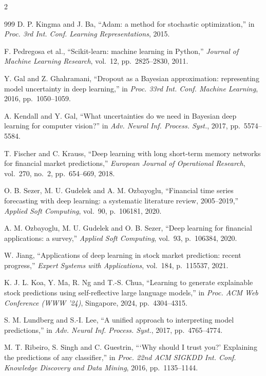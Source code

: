 \begin{footnotesize}
\begin{multicols}{2}
\begin{thebibliography}{999}
 D. P. Kingma and J. Ba, ``Adam: a method for stochastic optimization,'' in
\emph{Proc. 3rd Int. Conf. Learning Representations}, 2015.

 F. Pedregosa et al., ``Scikit-learn: machine learning in Python,''
\emph{Journal of Machine Learning Research}, vol.~12, pp.~2825--2830, 2011.

 Y. Gal and Z. Ghahramani, ``Dropout as a Bayesian approximation:
representing model uncertainty in deep learning,'' in \emph{Proc. 33rd Int. Conf. Machine
Learning}, 2016, pp.~1050--1059.

 A. Kendall and Y. Gal, ``What uncertainties do we need in Bayesian deep
learning for computer vision?'' in \emph{Adv. Neural Inf. Process. Syst.}, 2017, pp.~5574--5584.

 T. Fischer and C. Krauss, ``Deep learning with long short-term memory
networks for financial market predictions,'' \emph{European Journal of Operational Research},
vol.~270, no.~2, pp.~654--669, 2018.

 O. B. Sezer, M. U. Gudelek and A. M. Ozbayoglu, ``Financial time series
forecasting with deep learning: a systematic literature review, 2005--2019,'' \emph{Applied Soft
Computing}, vol.~90, p.~106181, 2020.

 A. M. Ozbayoglu, M. U. Gudelek and O. B. Sezer, ``Deep learning for
financial applications: a survey,'' \emph{Applied Soft Computing}, vol.~93, p.~106384, 2020.

 W. Jiang, ``Applications of deep learning in stock market prediction: recent
progress,'' \emph{Expert Systems with Applications}, vol.~184, p.~115537, 2021.

 K. J. L. Koa, Y. Ma, R. Ng and T.-S. Chua, ``Learning to generate explainable
stock predictions using self-reflective large language models,'' in \emph{Proc. ACM Web Conference
(WWW '24)}, Singapore, 2024, pp.~4304--4315.

 S. M. Lundberg and S.-I. Lee, ``A unified approach to interpreting model
predictions,'' in \emph{Adv. Neural Inf. Process. Syst.}, 2017, pp.~4765--4774.

 M. T. Ribeiro, S. Singh and C. Guestrin, ```Why should I trust you?'
Explaining the predictions of any classifier,'' in \emph{Proc. 22nd ACM SIGKDD Int. Conf.
Knowledge Discovery and Data Mining}, 2016, pp.~1135--1144.


\end{thebibliography}
\end{multicols}
\end{footnotesize}
